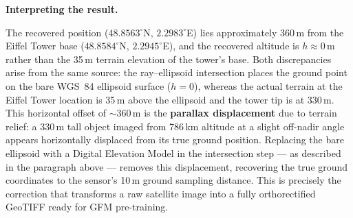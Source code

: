\documentclass{book}
\begin{document}
\medskip
\noindent\textbf{Interpreting the result.}

The recovered position ($48.8563^\circ$N, $2.2983^\circ$E) lies
approximately 360\,m from the Eiffel Tower base
($48.8584^\circ$N, $2.2945^\circ$E), and the recovered altitude
is $h \approx 0$\,m rather than the 35\,m terrain elevation of the
tower's base.  Both discrepancies arise from the same source: the
ray--ellipsoid intersection places the ground point on the bare
WGS~84 ellipsoid surface ($h = 0$), whereas the actual terrain at
the Eiffel Tower location is 35\,m above the ellipsoid and the tower
tip is at 330\,m.  This horizontal offset of $\sim$360\,m is the
\textbf{parallax displacement} due to terrain relief: a 330\,m tall
object imaged from 786\,km altitude at a slight off-nadir angle
appears horizontally displaced from its true ground position.
Replacing the bare ellipsoid with a Digital Elevation Model in the
intersection step --- as described in the paragraph above --- removes
this displacement, recovering the true ground coordinates to the
sensor's 10\,m ground sampling distance.  This is precisely the
correction that transforms a raw satellite image into a fully
orthorectified GeoTIFF ready for GFM pre-training.

\end{document}
